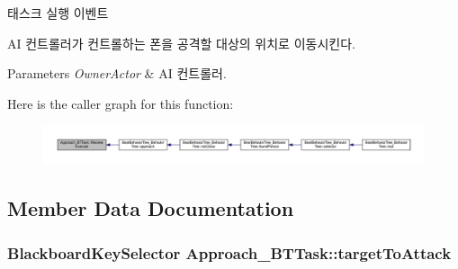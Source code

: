 태스크 실행 이벤트 

AI 컨트롤러가 컨트롤하는 폰을 공격할 대상의 위치로 이동시킨다. 
\begin{DoxyParams}{Parameters}
{\em Owner\+Actor} & AI 컨트롤러. \\
\hline
\end{DoxyParams}


Here is the caller graph for this function\+:
\nopagebreak
\begin{figure}[H]
\begin{center}
\leavevmode
\includegraphics[width=350pt]{class_approach___b_t_task_aab5432bc101b98aaed56ed2880688a14_icgraph}
\end{center}
\end{figure}




\subsection{Member Data Documentation}
\subsubsection[{\texorpdfstring{target\+To\+Attack}{targetToAttack}}]{\setlength{\rightskip}{0pt plus 5cm}Blackboard\+Key\+Selector Approach\+\_\+\+B\+T\+Task\+::target\+To\+Attack}\hypertarget{class_approach___b_t_task_a0af1525e9ae6377da4fecc32e1dfe5f3}{}\label{class_approach___b_t_task_a0af1525e9ae6377da4fecc32e1dfe5f3}
